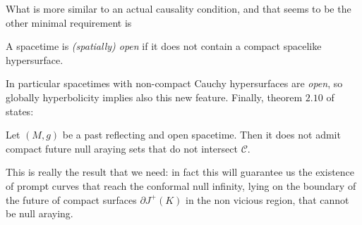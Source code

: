 	What is more similar to an actual causality condition, and that seems to be the other minimal requirement is
	\begin{definition}
		A spacetime is \emph{(spatially) open} if it does not contain a compact spacelike hypersurface.
	\end{definition}	
	In particular spacetimes with non-compact Cauchy hypersurfaces are \emph{open}, so globally hyperbolicity implies also this new feature. 
	Finally, theorem \(2.10\) of~\cite[]{minguzzi2020gravitational} states:
	\begin{theorem}
		Let \((M,g)\) be a past reflecting and open spacetime. Then it does not admit compact future null araying sets that do not intersect \(\mathcal{C}\).
	\end{theorem}
	This is really the result that we need: in fact this will guarantee us the existence of prompt curves that reach the conformal null infinity, lying on the boundary of the future of compact surfaces \(\partial J^+(K)\) in the non vicious region, that cannot be null araying.